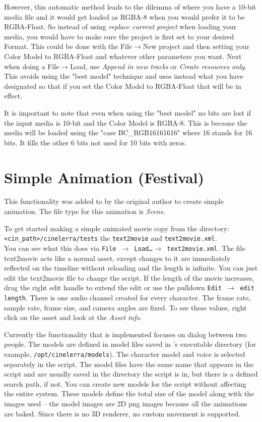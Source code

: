 However, this automatic method leads to the dilemma of where you have a 10-bit media file and it would
get loaded as RGBA-8 when you would prefer it to be RGBA-Float.  So instead of using \textit{replace current
project} when loading your media, you would have to make sure the project is first set to your desired
Format.  This could be done with the File$\rightarrow$New project and then setting your Color
Model to RGBA-Float and whatever other parameters you want.  Next when doing a File$\rightarrow$Load, use
\textit{Append in new tracks} or \textit{Create resources only}. This avoids using the "best model"
technique and uses instead what you have designated so that if you set the Color Model to RGBA-Float that
will be in effect.

It is important to note that even when using the "best model" no bits are lost if the input media is 10-bit
and the Color Model is RGBA-8. This is because the media will be loaded using the "case BC\_RGB16161616"
where 16 stands for 16 bits. It fills the other 6 bits not used for 10 bits with zeros.

\section{Simple Animation (Festival)}%
\label{sec:simple_animation_festival}

This functionality was added to \CGG{} by the original author to create simple animation.  The file type for this animation is \textit{Scene}.

To get started making a simple animated movie copy from the directory:\\
\texttt{<cin\_path>/cinelerra/tests} the \texttt{text2movie} and \texttt{text2movie.xml}. \\
You can see what this does via \texttt{File $\rightarrow$ Load\dots $\rightarrow$ text2movie.xml}.  The file text2movie acts like a normal asset, except changes to it are immediately reflected on the timeline without reloading and the length is infinite.  You can just edit the text2movie file to change the script.  If the length of the movie increases, drag the right edit handle to extend the edit or use the pulldown \texttt{Edit $\rightarrow$ edit length}. There is one audio channel created for every character.  The frame rate, sample rate, frame size, and camera angles are fixed.  To see these values, right click on the asset and look at the \textit{Asset info}.

Currently the functionality that is implemented focuses on dialog between two people.  The models are defined in model files saved in \CGG{}'s executable directory (for example, \texttt{/opt/cinelerra/models}).  The character model and voice is selected separately in the script.  The model files have the same name that appears in the script and are usually saved in the directory the script is in, but there is a defined search path, if not.  You can create new models for the script without affecting the entire system.  These models define the total size of the model along with the images used -- the model images are 2D png images because all the animations are baked.  Since there is no 3D renderer, no custom movement is supported.

